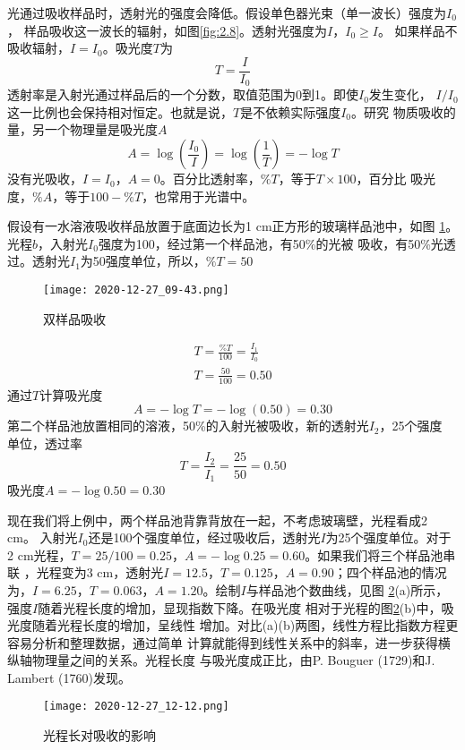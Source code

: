 光通过吸收样品时，透射光的强度会降低。假设单色器光束（单一波长）强度为$I_0$，
样品吸收这一波长的辐射，如图\ref{fig:2.8}。透射光强度为$I$，$I_0 \geq I$。
如果样品不吸收辐射，$I = I_0$。吸光度$T$为
\begin{equation}
    T = \frac{I}{I_0}
    \label{2.7}
\end{equation}
透射率是入射光通过样品后的一个分数，取值范围为0到1。即使$I_0$发生变化，
$I/I_0$这一比例也会保持相对恒定。也就是说，$T$是不依赖实际强度$I_0$。研究
物质吸收的量，另一个物理量是吸光度$A$
\begin{equation}
    A=\log{\left(\frac{I_0}{I}\right)}
    =\log{\left(\frac{1}{T}\right)}=-\log{T}
    \label{2.8}
\end{equation}
没有光吸收，$I=I_0$，$A=0$。百分比透射率，$\% T$，等于$T\times 100$，百分比
吸光度，$\% A$，等于$100-\%T$，也常用于光谱中。
\begin{problem}
    假设有一水溶液吸收样品放置于底面边长为1 cm正方形的玻璃样品池中，如图
    \ref{fig:2.9}。光程$b$，入射光$I_0$强度为100，经过第一个样品池，有50\%的光被
    吸收，有50\%光透过。透射光$I_1$为50强度单位，所以，$\% T = 50$
    \begin{figure}[htpb]
        \centering
        \texttt{[image: 2020-12-27\_09-43.png]}
        \caption{双样品吸收}
        \label{fig:2.9}
    \end{figure}
    \[
        \begin{array}{l}
            T = \frac{\% T}{100} = \frac{I_1}{I_0}\\
            T = \frac{50}{100} = 0.50
        \end{array}
    \]
    通过$T$计算吸光度
    \[
        A = -\log{T} = -\log{\left(0.50\right)} = 0.30
    \]
    第二个样品池放置相同的溶液，50\%的入射光被吸收，新的透射光$I_2$，25个强度
    单位，透过率
    \[
        T = \frac{I_2}{I_1}=\frac{25}{50}=0.50
    \]
    吸光度$A=-\log{0.50}=0.30$
\end{problem}
\begin{problem}
    现在我们将上例中，两个样品池背靠背放在一起，不考虑玻璃壁，光程看成2 cm。
    入射光$I_0$还是100个强度单位，经过吸收后，透射光$I$为25个强度单位。对于
    2 cm光程，$T=25/100=0.25$，$A=-\log{0.25}=0.60$。如果我们将三个样品池串联
    ，光程变为3 cm，透射光$I = 12.5$，$T=0.125$，$A=0.90$；四个样品池的情况
    为，$I=6.25$，$T=0.063$，$A=1.20$。绘制$I$与样品池个数曲线，见图
    \ref{fig:2.10}(a)所示，强度$I$随着光程长度的增加，显现指数下降。在吸光度
    相对于光程的图\ref{fig:2.10}(b)中，吸光度随着光程长度的增加，呈线性
    增加。对比(a)(b)两图，线性方程比指数方程更容易分析和整理数据，通过简单
    计算就能得到线性关系中的斜率，进一步获得横纵轴物理量之间的关系。光程长度
    与吸光度成正比，由P. Bouguer (1729)和J. Lambert (1760)发现。
    \begin{figure}[htpb]
        \centering
        \texttt{[image: 2020-12-27\_12-12.png]}
        \caption{光程长对吸收的影响}
        \label{fig:2.10}
    \end{figure}
\end{problem}

